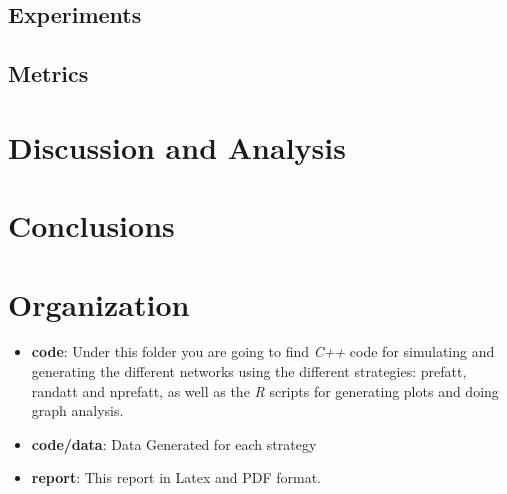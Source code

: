 \documentclass[12pt, a4paper]{article}
\begin{document}
\subsection{Experiments}

\subsection{Metrics}

\section{Discussion and Analysis}
\section{Conclusions}




\appendix
\section{Organization}

\begin{itemize}
    \item \textbf{code}: Under this folder you are going to find \textit{C++} code for simulating and generating the different networks using the different strategies: \acrfull{prefatt}, \acrfull{randatt} and \acrfull{nprefatt}, as well as the \textit{R} scripts for generating plots and doing graph analysis.
    \item \textbf{code/data}: Data Generated for each strategy
    \item \textbf{report}: This report in Latex and PDF format.
\end{itemize}
\end{document}
